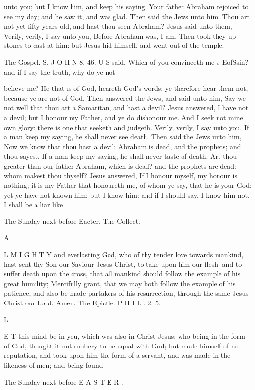 unto you; but I know him, and keep his saying. Your father Abraham rejoiced to see my day; and he saw it, and was glad. Then said the Jews unto him, Thou art not yet fifty years old, and hast thou seen Abraham? Jesus said unto them, Verily, verily, I say unto you, Before Abraham was, I am. Then took they up stones to cast at him: but Jesus hid himself, and went out of the temple.

The Gospel. S. J O H N 8. 46. U S said, Which of you convinceth me J EofSsin? and if I say the truth, why do ye not

believe me? He that is of God, heareth God’s words; ye therefore hear them not, because ye are not of God. Then answered the Jews, and said unto him, Say we not well that thou art a Samaritan, and hast a devil? Jesus answered, I have not a devil; but I honour my Father, and ye do dishonour me. And I seek not mine own glory: there is one that seeketh and judgeth. Verily, verily, I say unto you, If a man keep my saying, he shall never see death. Then said the Jews unto him, Now we know that thou hast a devil: Abraham is dead, and the prophets; and thou sayest, If a man keep my saying, he shall never taste of death. Art thou greater than our father Abraham, which is dead? and the prophets are dead: whom makest thou thyself? Jesus answered, If I honour myself, my honour is nothing; it is my Father that honoureth me, of whom ye say, that he is your God: yet ye have not known him; but I know him: and if I should say, I know him not, I shall be a liar like

The Sunday next before Eacter. The Collect.

A

L M I G H T Y and everlasting God, who of thy tender love towards mankind, hast sent thy Son our Saviour Jesus Christ, to take upon him our flesh, and to suffer death upon the cross, that all mankind should follow the example of his great humility; Mercifully grant, that we may both follow the example of his patience, and also be made partakers of his resurrection, through the same Jesus Christ our Lord. Amen. The Epictle. P H I L . 2. 5.

L

E T this mind be in you, which was also in Christ Jesus: who being in the form of God, thought it not robbery to be equal with God; but made himself of no reputation, and took upon him the form of a servant, and was made in the likeness of men; and being found

The Sunday next before E A S T E R .

